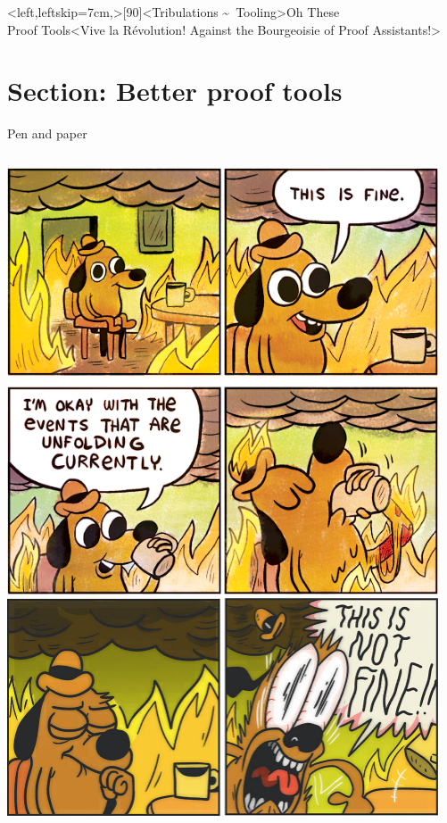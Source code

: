 \interlude*<left,leftskip=7cm,>[90]<Tribulations \textasciitilde\ Tooling>{Oh These\\Proof Tools}<Vive la Révolution! Against the Bourgeoisie of Proof Assistants!>
\section{Section: Better proof tools}

\begin{frame}{Pen and paper}
  \begin{columns}[c]
    \begin{column}{.35\linewidth}
      \includegraphics[width=\linewidth]{graphics/this-is-fine-crop.png}\\
      \includegraphics[width=\linewidth]{graphics/this-is-not-fine-crop.jpg}%
    \end{column}
    \hspace{1.2em}
    \begin{column}{.68\linewidth}
      \small


\end{column}
\end{columns}
\end{frame}
